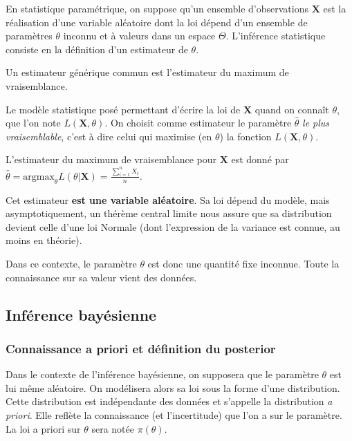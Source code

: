 \documentclass[]{article}
\begin{document}
En statistique paramétrique, on suppose qu'un ensemble d'observations
\(\mathbf{X}\) est la réalisation d'une variable aléatoire dont la loi
dépend d'un ensemble de paramètres \(\theta\) inconnu et à valeurs dans
un espace \(\Theta\). L'inférence statistique consiste en la définition
d'un estimateur de \(\theta\).

Un estimateur générique commun est l'estimateur du maximum de
vraisemblance.

Le modèle statistique posé permettant d'écrire la loi de \(\mathbf{X}\)
quand on connaît \(\theta\), que l'on note \(L(\mathbf{X}, \theta)\). On
choisit comme estimateur le paramètre \(\hat{\theta}\)
\textit{le plus vraisemblable}, c'est à dire celui qui maximise (en
\(\theta\)) la fonction \(L(\mathbf{X}, \theta)\).

L'estimateur du maximum de vraisemblance pour \(\mathbf{X}\) est donné
par
\(\hat{\theta} = \text{argmax}_{\theta}L(\theta\vert \mathbf{X}) = \frac{\sum_{i=1}^n X_i}{n}\).

Cet estimateur \textbf{est une variable aléatoire}. Sa loi dépend du
modèle, mais asymptotiquement, un thérème central limite nous assure que
sa distribution devient celle d'une loi Normale (dont l'expression de la
variance est connue, au moins en théorie).

Dans ce contexte, le paramètre \(\theta\) est donc une quantité fixe
inconnue. Toute la connaissance sur sa valeur vient des données.

\hypertarget{infuxe9rence-bayuxe9sienne-1}{%
\subsection{Inférence bayésienne}\label{infuxe9rence-bayuxe9sienne-1}}

\hypertarget{connaissance-a-priori-et-duxe9finition-du-posterior}{%
\subsubsection{Connaissance a priori et définition du
posterior}\label{connaissance-a-priori-et-duxe9finition-du-posterior}}

Dans le contexte de l'inférence bayésienne, on supposera que le
paramètre \(\theta\) est lui même aléatoire. On modélisera alors sa loi
sous la forme d'une distribution. Cette distribution est indépendante
des données et s'appelle la distribution \textit{a priori}. Elle reflète
la connaissance (et l'incertitude) que l'on a sur le paramètre. La loi a
priori sur \(\theta\) sera notée \(\pi(\theta)\).
\end{document}

